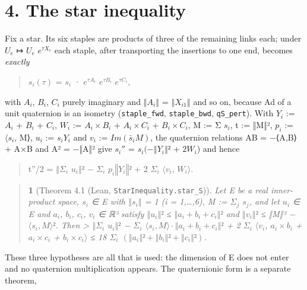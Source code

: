 \documentclass[11pt,a4paper]{article}
\theoremstyle{named}
\newtheorem*{namedthm}{}
\begin{document}
\section*{4. The star inequality}
Fix a star. Its six staples are products of three of the remaining links each; under $U_e$ ↦ $U_e$ $e^{τX_e}$ each staple, after transporting the insertions to one end, becomes \textit{exactly}

\begin{quote}
$s_i(τ)$ = $s_i$ · $e^{τA_i}$ $e^{τB_i}$ $e^{τC_i}$,
\end{quote}
with $A_i$, $B_i$, $C_i$ purely imaginary and $‖A_i‖$ = $‖X_{i1}‖$ and so on, because Ad of a unit quaternion is an isometry (\texttt{staple\_\allowbreak{}fwd}, \texttt{staple\_\allowbreak{}bwd}, \texttt{qS\_\allowbreak{}pert}). With $Y_i$ := $A_i$ + $B_i$ + $C_i$, $W_i$ := $A_i×B_i$ + $A_i×C_i$ + $B_i×C_i$, M := Σ $s_i$, t := ‖M‖², $p_i$ := $⟨s_i$, M⟩, $u_i$ := $s_iY_i$ and $v_i$ := $Im(\bar{s}_iM)$, the quaternion relations AB = −⟨A,B⟩ + A×B and A² = −‖A‖² give $s_i''$ = $s_i(−‖Y_i‖²$ + $2W_i$) and hence

\begin{quote}
t''/2 = $‖Σ_i$ $u_i‖²$ − $Σ_i$ $p_i‖Y_i‖²$ + 2 $Σ_i$ $⟨v_i$, $W_i⟩$.
\end{quote}
\begin{quote}
\begin{namedthm}[Theorem 4.1 (Lean, \texttt{StarInequality.\allowbreak{}star\_\allowbreak{}S})]
Let E be a real inner-product space, $s_i$ ∈ E with $‖s_i‖$ = 1 (i = 1,…,6), M := $Σ_j$ $s_j$, and let $u_i$ ∈ E and $a_i$, $b_i$, $c_i$, $v_i$ ∈ ℝ³ satisfy $‖u_i‖²$ ≤ $‖a_i+b_i+c_i‖²$ and $‖v_i‖²$ ≤ ‖M‖² − $⟨s_i,M⟩²$. Then \textgreater{} $‖Σ_i$ $u_i‖²$ − $Σ_i$ $⟨s_i,M⟩·‖a_i+b_i+c_i‖²$ + 2 $Σ_i$ $⟨v_i$, $a_i×b_i$ + $a_i×c_i$ + $b_i×c_i⟩$ ≤ 18 $Σ_i$ $(‖a_i‖²+‖b_i‖²+‖c_i‖²)$.
\end{namedthm}
\end{quote}
These three hypotheses are all that is used: the dimension of E does not enter and no quaternion multiplication appears. The quaternionic form is a separate theorem,
\end{document}
